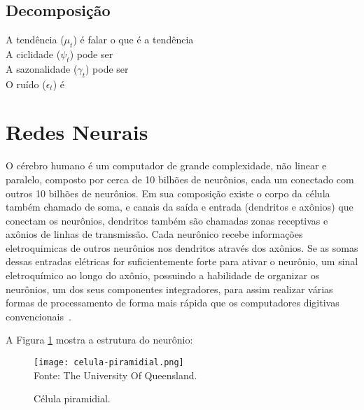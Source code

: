     \subsection{Decomposição}

        A tendência ($\mu_t$) é falar o que é a tendência \\
        
        A ciclidade ($\psi_t$) pode ser \\
        
        A sazonalidade ($\gamma_t$) pode ser \\
        
        O ruído ($\epsilon_t$) é 




\section{Redes Neurais}
    O cérebro humano é um computador de grande complexidade, não linear e paralelo, 
    composto por cerca de 10 bilhões de neurônios, cada um conectado com outros 10 
    bilhões de neurônios. Em sua composição existe o corpo da célula também chamado de 
    soma, e canais da saída e entrada (dendritos e axônios) que conectam os neurônios, 
    dendritos também são chamadas zonas receptivas e axônios de linhas de transmissão. 
    Cada neurônico recebe informações eletroquimicas de outros neurônios nos dendritos 
    através dos axônios. Se as somas dessas entradas elétricas for suficientemente forte 
    para ativar o neurônio, um sinal eletroquímico ao longo do axônio, possuindo a 
    habilidade de organizar os neurônios, um dos seus componentes integradores, para 
    assim realizar várias formas de processamento de forma mais rápida que os 
    computadores digitivas convencionais~\cite{haykin2009neural}.

    A Figura \ref{fig:celula_piramidial} mostra a estrutura do neurônio:
    \begin{figure}[!htb]
        \centering
        \caption{Célula piramidial.}
        \texttt{[image: celula-piramidial.png]}\\
        {\footnotesize Fonte: The University Of Queensland.}\
        \label{fig:celula_piramidial}
    \end{figure}
        
